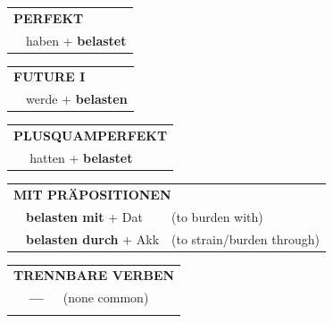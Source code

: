 \documentclass[10pt,a4paper]{revtex4-2}
\begin{document}
\begin{verbbox}
 \begin{tabular}{rl}
     \multicolumn{2}{l}{\textbf{PERFEKT}}\\
   & haben + \textbf{belastet}\\
  \end{tabular}
\hfill
   \begin{tabular}{rl}
    \multicolumn{2}{l}{\textbf{FUTURE I} }\\
   & werde + \textbf{belasten}\\
  \end{tabular}
\hfill
   \begin{tabular}{rl}
      \multicolumn{2}{l}{\textbf{PLUSQUAMPERFEKT}}\\
   & hatten + \textbf{belastet}\\
  \end{tabular}

   \vspace{10pt}

   \begin{tabular}{lll}
      \multicolumn{3}{l}{\textbf{MIT PRÄPOSITIONEN}}\\
& \textbf{belasten mit} + Dat & (to burden with)\\
& \textbf{belasten durch} + Akk & (to strain/burden through)\\
\end{tabular}
  \hfill
   \begin{tabular}{lll}
      \multicolumn{3}{l}{\textbf{TRENNBARE VERBEN}}\\
 & \textbf{---} & (none common)\\
\vspace{10pt}
  \end{tabular}

  \vspace{-5pt}

\end{verbbox}
\end{document}
